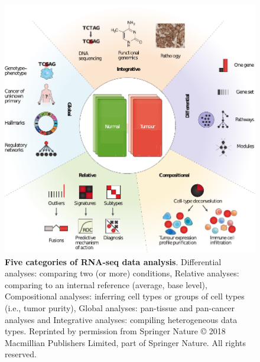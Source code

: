 \documentclass[12pt,]{book}
\theoremstyle{definition}
\theoremstyle{definition}
\theoremstyle{definition}
\theoremstyle{remark}
\begin{document}
\begin{figure}

{\centering \includegraphics[width=1\linewidth]{figures-ext/transcriptome-methods} 

}

\caption[Five categories of RNA-seq data analysis.]{\textbf{Five categories of RNA-seq
data analysis}. Differential analyses: comparing two (or more)
conditions, Relative analyses: comparing to an internal reference
(average, base level), Compositional analyses: inferring cell types or
groups of cell types (i.e., tumor purity), Global analyses: pan-tissue
and pan-cancer analyses and Integrative analyses: compiling
heterogeneous data types. Reprinted by permission from Springer Nature
\citep{Cieslik2017} © 2018 Macmillian Publishers Limited, part of
Springer Nature. All rights reserved.}\label{fig:transcriptome-methods}
\end{figure}
\end{document}
